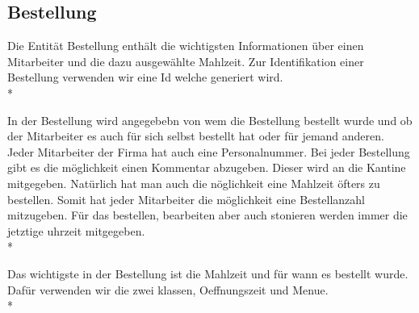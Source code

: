\subsection{Bestellung} 

Die Entität Bestellung enthält die wichtigsten Informationen über einen Mitarbeiter und die dazu ausgewählte Mahlzeit.
Zur Identifikation einer Bestellung verwenden wir eine Id welche generiert wird. \\*

In der Bestellung wird angegebebn von wem die Bestellung bestellt wurde und ob der Mitarbeiter es auch für sich selbst bestellt hat oder für jemand anderen. 
Jeder Mitarbeiter der Firma hat auch eine Personalnummer. Bei jeder Bestellung gibt es die möglichkeit einen Kommentar abzugeben. Dieser wird an die Kantine mitgegeben. Natürlich hat man auch die nöglichkeit 
eine Mahlzeit öfters zu bestellen. Somit hat jeder Mitarbeiter die möglichkeit eine Bestellanzahl mitzugeben. Für das bestellen, bearbeiten aber auch stonieren werden immer die jetztige uhrzeit mitgegeben. \\*

Das wichtigste in der Bestellung ist die Mahlzeit und für wann es bestellt wurde. Dafür verwenden wir die zwei klassen, Oeffnungszeit und Menue. \\*




